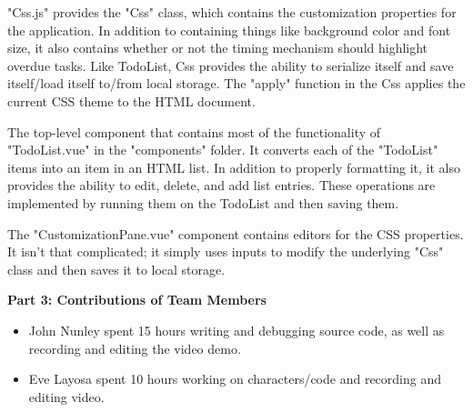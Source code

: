 \documentclass[12pt]{article}
\begin{document}
\begin{flushleft}
"Css.js" provides the "Css" class, which contains the customization properties for the application. In addition to containing things like background color and font size, it also contains whether or not the timing mechanism should highlight overdue tasks. Like TodoList, Css provides the ability to serialize itself and save itself/load itself to/from local storage. The "apply" function in the Css applies the current CSS theme to the HTML document.

The top-level component that contains most of the functionality of "TodoList.vue" in the "components" folder. It converts each of the "TodoList" items into an item in an HTML list. In addition to properly formatting it, it also provides the ability to edit, delete, and add list entries. These operations are implemented by running them on the TodoList and then saving them.

The "CustomizationPane.vue" component contains editors for the CSS properties. It isn't that complicated; it simply uses inputs to modify the underlying "Css" class and then saves it to local storage.

\textbf{Part 3: Contributions of Team Members}

\begin{itemize}
    \item John Nunley spent 15 hours writing and debugging source code, as well as recording and editing the video demo.
    \item Eve Layosa spent 10 hours working on characters/code and recording and editing video.
\end{itemize}

\end{flushleft}
\end{document}

